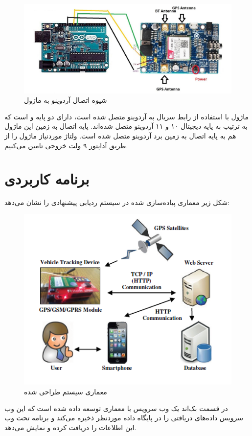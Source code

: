 \begin{figure}[!h]
	\centerline{\includegraphics[width=.8\textwidth]{sim808-arduino}}
	\caption{شیوه اتصال آردوینو به ماژول  \cite{interface}}
\end{figure}


ماژول  با استفاده از رابط سریال به آردوینو متصل شده است، دارای دو پایه  و  است که به ترتیب به پایه دیجیتال ۱۰ و ۱۱ آردوینو متصل شده‌اند. پایه اتصال به زمین این ماژول هم به پایه اتصال به زمین برد آردوینو متصل شده است. ولتاژ موردنیاز ماژول  را از طریق آداپتور ۹ ولت خروجی تامین می‌کنیم. 
\newpage
\section{برنامه کاربردی}
شکل زیر معماری پیاده‌سازی شده در سیستم ردیابی پیشنهادی را نشان می‌دهد:

\begin{figure}[!h]
	\centerline{\includegraphics[width=.7\textwidth]{softarc}}
	\caption{معماری سیستم طراحی شده \cite{one}}
\end{figure}

در قسمت بک‌اند یک وب سرویس با معماری  توسعه داده شده است که این وب سرویس داده‌های دریافتی را در پایگاه داده موردنظر ذخیره می‌کند و برنامه تحت وب این اطلاعات را دریافت کرده و نمایش می‌دهد.


